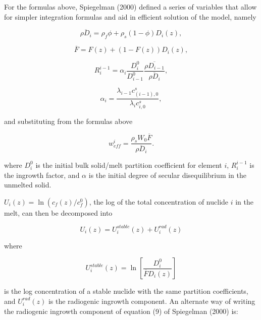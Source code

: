 \documentclass[11pt]{article}
\begin{document}
For the formulas above, Spiegelman (2000) defined a series of variables that allow for simpler integration formulas and aid in efficient solution of the model, namely

\begin{equation}
    \overline{\rho D_i} = \rho_f \phi + \rho_s (1-\phi)D_i(z) ,\label{eq:10}
\end{equation}

\begin{equation}
    \overline{F} = F(z) + (1-F(z)) D_i(z) ,\label{eq:11}
\end{equation}

\begin{equation}
    R_i^{i-1} = \alpha_i \frac{D_i^0}{D_{i-1}^0} \frac{\overline{\rho D_{i-1}}}{\overline{\rho D_i}} ,\label{eq:12}
\end{equation}

\begin{equation}
    \alpha_i = \frac{\lambda_{i-1} c_{(i-1),0}^s}{\lambda_i c_{i,0}^s} ,\label{eq:13}
\end{equation}

and substituting from the formulas above

\begin{equation}
    w_{eff}^i = \frac{\rho_s W_0 \overline{F}}{\overline{\rho D_i}} .\label{eq:14}
\end{equation}

where $D_i^0$ is the initial bulk solid/melt partition coefficient for element $i$, $R_i^{i-1}$ is the ingrowth factor, and $\alpha$ is the initial degree of secular disequilibrium in the unmelted solid.

$U_i(z) = \ln(c_f(z)/c_f^0)$, the log of the total concentration of nuclide $i$ in the melt, can then be decomposed into

\begin{equation}
  U_i(z) = U^{stable}_i(z) + U^{rad}_i(z)\label{eq:15}
\end{equation}

where

\begin{equation}
    U^{stable}_i(z) = \ln\left[ \frac{D_i^0}{\overline{F}D_i(z)}\right]\label{eq:16}
\end{equation}

is the log concentration of a stable nuclide with the same partition coefficients, and $U^{rad}_i(z)$ is the radiogenic ingrowth component. An alternate way of writing the radiogenic ingrowth component of equation (9) of Spiegelman (2000) is:
\end{document}

